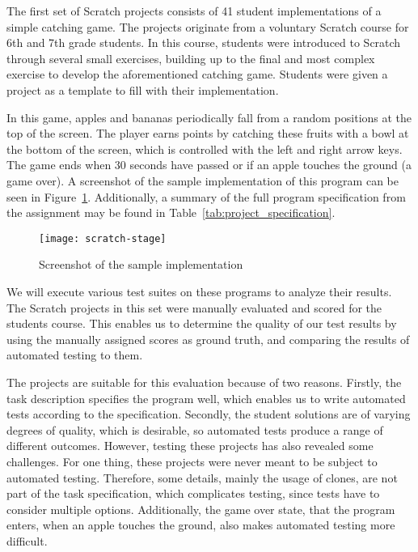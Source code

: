 The first set of Scratch projects consists of 41 student implementations of a simple catching game.
The projects originate from a voluntary Scratch course for 6th and 7th grade students.
In this course, students were introduced to Scratch through several small exercises,
building up to the final and most complex exercise to develop the aforementioned catching game.
Students were given a project as a template to fill with their implementation.
\parspace

In this game, apples and bananas periodically fall from a random positions at the top of the screen.
The player earns points by catching these fruits with a bowl at the bottom of the screen,
which is controlled with the left and right arrow keys.
The game ends when 30 seconds have passed or if an apple touches the ground (a game over).
A screenshot of the sample implementation of this program can be seen in Figure~\ref{fig:screenshot_of_the_sample_implementation}.
Additionally, a summary of the full program specification from the assignment may be found in Table~\ref{tab:project_specification}.
\parspace

\begin{figure}[htpb]
    \centering
    \texttt{[image: scratch-stage]}
    \caption{Screenshot of the sample implementation}
    \label{fig:screenshot_of_the_sample_implementation}
\end{figure}

We will execute various test suites on these programs to analyze their results.
The Scratch projects in this set were manually evaluated and scored for the students course.
This enables us to determine the quality of our test results by using the manually assigned scores as ground truth,
and comparing the results of automated testing to them.
\parspace

The projects are suitable for this evaluation because of two reasons.
Firstly, the task description specifies the program well, which enables us to write automated tests according to the specification.
Secondly, the student solutions are of varying degrees of quality,
which is desirable, so automated tests produce a range of different outcomes.
However, testing these projects has also revealed some challenges.
For one thing, these projects were never meant to be subject to automated testing.
Therefore, some details, mainly the usage of clones,
are not part of the task specification, which complicates testing,
since tests have to consider multiple options.
Additionally, the game over state, that the program enters,
when an apple touches the ground, also makes automated testing more difficult.
\parspace

